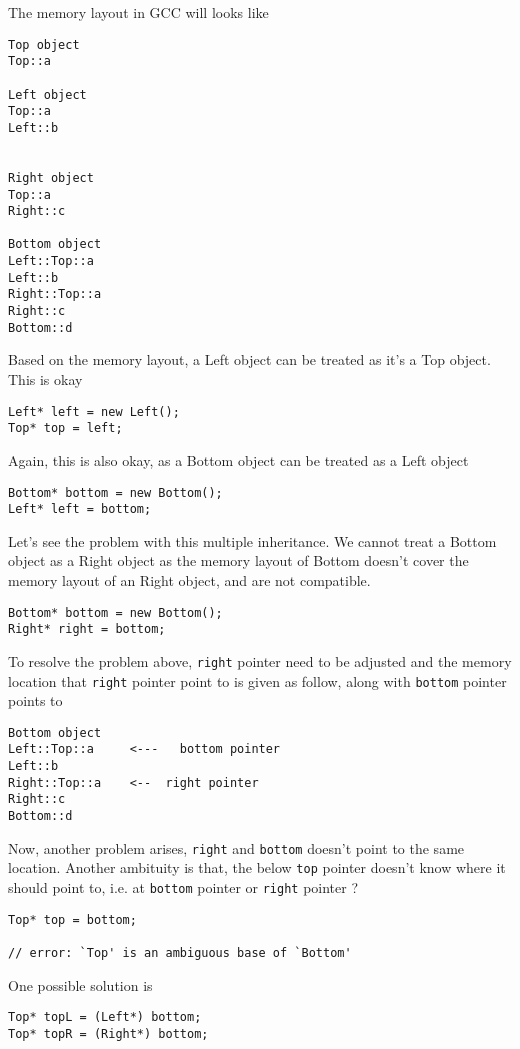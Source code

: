The memory layout in GCC will looks like
\begin{verbatim}
Top object
Top::a

Left object
Top::a
Left::b


Right object
Top::a
Right::c

Bottom object
Left::Top::a
Left::b
Right::Top::a
Right::c
Bottom::d
\end{verbatim}

Based on the memory layout, a Left object can be treated as it's a Top
object. This is okay
\begin{verbatim}
Left* left = new Left();
Top* top = left;
\end{verbatim}

Again, this is also okay, as a Bottom object can be treated as a Left object
\begin{verbatim}
Bottom* bottom = new Bottom();
Left* left = bottom;
\end{verbatim}


Let's see the problem with this multiple inheritance. We cannot treat a Bottom
object as a Right object as the memory layout of Bottom doesn't cover the memory
layout of an Right object, and are not compatible.
\begin{verbatim}
Bottom* bottom = new Bottom();
Right* right = bottom;
\end{verbatim}
		
To resolve the problem above, \verb!right! pointer need to be
adjusted and the memory location that \verb!right! pointer point to
is given as follow, along with \verb!bottom! pointer points to
\begin{verbatim}
Bottom object
Left::Top::a     <---   bottom pointer
Left::b
Right::Top::a    <--  right pointer
Right::c
Bottom::d
\end{verbatim}


Now, another problem arises, \verb!right! and \verb!bottom! doesn't point to the
same location. Another ambituity is that, the below \verb!top! pointer doesn't
know where it should point to, i.e. at \verb!bottom! pointer or \verb!right!
pointer ?
\begin{verbatim}
Top* top = bottom;

// error: `Top' is an ambiguous base of `Bottom'
\end{verbatim}

One possible solution is 
\begin{verbatim}
Top* topL = (Left*) bottom;
Top* topR = (Right*) bottom;
\end{verbatim}

